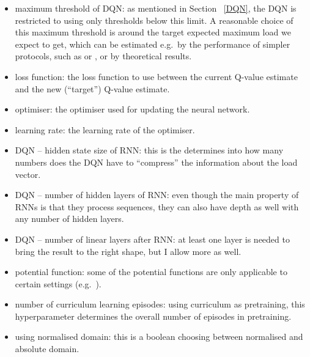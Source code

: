 \begin{itemize}
    \item maximum threshold of DQN: as mentioned in Section ~\ref{DQN}, the DQN is restricted to using only thresholds below this limit. A reasonable choice of this maximum threshold is around the target expected maximum load we expect to get, which can be estimated e.g.\ by the performance of simpler protocols, such as \OneChoice or \TwoChoice, or by theoretical results.
    
    \item loss function: the loss function to use between the current Q-value estimate and the new (``target'') Q-value estimate. 
    
    \item optimiser: the optimiser used for updating the neural network. 
    
    \item learning rate: the learning rate of the optimiser. 
    
    \item DQN -- hidden state size of RNN: this is the determines into how many numbers does the DQN have to ``compress'' the information about the load vector.
    
    \item DQN -- number of hidden layers of RNN: even though the main property of RNNs is that they process sequences, they can also have depth as well with any number of hidden layers.
    
    \item DQN -- number of linear layers after RNN: at least one layer is needed to bring the result to the right shape, but I allow more as well.
    
    \item potential function: some of the potential functions are only applicable to certain settings (e.g.\ \GraphicalTwoChoice).
    
    \item number of curriculum learning episodes: using curriculum as pretraining, this hyperparameter determines the overall number of episodes in pretraining.
    
    \item using normalised domain: this is a boolean choosing between normalised and absolute domain.
    
    


\end{itemize}


